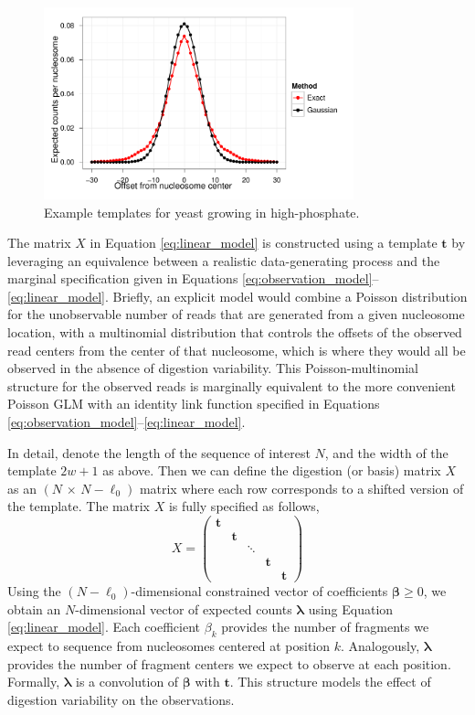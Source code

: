 \ifx\nofigures\undefined
\begin{figure}[t!]
\centering
 \includegraphics[width=0.8\textwidth]{figures/nucleosomes/plotTemplateVsApprox_H_1-combined}
 \caption{Example templates for yeast growing in high-phosphate.\label{fig:template}} 
\end{figure}
\fi

The matrix $X$ in Equation \ref{eq:linear_model} is constructed using a template $\bm t$ by leveraging an equivalence between a realistic data-generating process and the marginal specification given in Equations \ref{eq:observation_model}--\ref{eq:linear_model}.
%
Briefly, an explicit model would combine a Poisson distribution for the unobservable number of reads that are generated from a given nucleosome location, with a multinomial distribution that controls the offsets of the observed read centers from the center of that nucleosome, which is where they would all be observed in the absence of digestion variability.
%
This Poisson-multinomial structure for the observed reads is marginally equivalent to the more convenient Poisson GLM with an identity link function specified in Equations \ref{eq:observation_model}--\ref{eq:linear_model}.

In detail, denote the length of the sequence of interest $N$, and the width of the template $2w+1$ as above.
%
Then we can define the digestion (or basis) matrix $X$ as an $(N\,\times\,N - \ell_0)$ matrix where each row corresponds to a shifted version of the template.
The matrix $X$ is fully specified as follows,
\begin{equation}
	X = \begin{pmatrix}
	     \bm{t} &&&& \\
	     & \bm{t} &&& \\
	     && \ddots && \\
	     &&& \bm{t} &\\
	     &&&& \bm{t}
	    \end{pmatrix}
\end{equation}
%
Using the $(N - \ell_0)$-dimensional constrained vector of coefficients $\bm
\beta \geq 0$, we obtain an $N$-dimensional vector of expected counts $\bm
\lambda$ using Equation \ref{eq:linear_model}.
%
Each coefficient $\beta_k$ provides the number of fragments we expect to sequence from nucleosomes centered at position $k$.
%
Analogously, $\bm \lambda$ provides the number of fragment centers we expect to observe at each position.
Formally, $\bm \lambda$ is a convolution of $\bm \beta$ with $\bm t$.
This structure models the effect of digestion variability on the observations.

